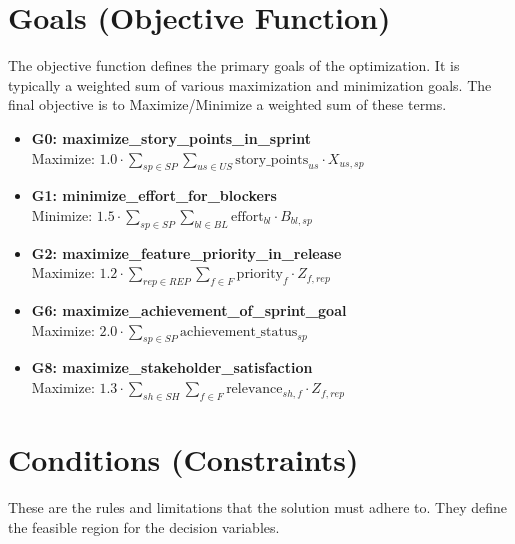 \documentclass[11pt]{article}
\begin{document}
\section{Goals (Objective Function)}
The objective function defines the primary goals of the optimization. It is typically a weighted sum of various maximization and minimization goals. The final objective is to Maximize/Minimize a weighted sum of these terms.

\begin{itemize}
    \item \textbf{G0: maximize\_story\_points\_in\_sprint} \\
    Maximize: $1.0 \cdot \sum_{sp \in SP} \sum_{us \in US} \text{story\_points}_{us} \cdot X_{us, sp}$
    
    \item \textbf{G1: minimize\_effort\_for\_blockers} \\
    Minimize: $1.5 \cdot \sum_{sp \in SP} \sum_{bl \in BL} \text{effort}_{bl} \cdot B_{bl, sp}$
    
    \item \textbf{G2: maximize\_feature\_priority\_in\_release} \\
    Maximize: $1.2 \cdot \sum_{rep \in REP} \sum_{f \in F} \text{priority}_{f} \cdot Z_{f, rep}$
    
    \item \textbf{G6: maximize\_achievement\_of\_sprint\_goal} \\
    Maximize: $2.0 \cdot \sum_{sp \in SP} \text{achievement\_status}_{sp}$
    
    \item \textbf{G8: maximize\_stakeholder\_satisfaction} \\
    Maximize: $1.3 \cdot \sum_{sh \in SH} \sum_{f \in F} \text{relevance}_{sh, f} \cdot Z_{f, rep}$
\end{itemize}

\section{Conditions (Constraints)}
These are the rules and limitations that the solution must adhere to. They define the feasible region for the decision variables.
\end{document}
